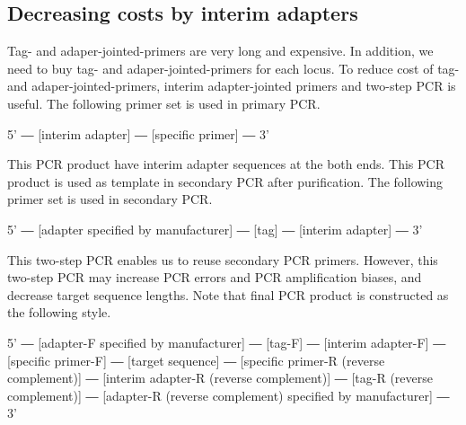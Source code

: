 \documentclass[titlepage,10pt,a4paper,english]{jsbook}
\newenvironment{pre}{\begin{leftbar}\raggedright\ttfamily\footnotesize\setlength{\baselineskip}{1.4em}}{\end{leftbar}\vspace{-1em}}
\begin{document}
\subsection{Decreasing costs by interim adapters}\label{subsection:interimadapter}

Tag- and adaper-jointed-primers are very long and expensive.
In addition, we need to buy tag- and adaper-jointed-primers for each locus.
To reduce cost of tag- and adaper-jointed-primers, interim adapter-jointed primers and two-step PCR is useful.
The following primer set is used in primary PCR.

\begin{pre}
5' ― [interim adapter] ― [specific primer] ― 3'
\end{pre}

This PCR product have interim adapter sequences at the both ends.
This PCR product is used as template in secondary PCR after purification.
The following primer set is used in secondary PCR.

\begin{pre}
5' ― [adapter specified by manufacturer] ― [tag] ― [interim adapter] ― 3'
\end{pre}

This two-step PCR enables us to reuse secondary PCR primers.
However, this two-step PCR may increase PCR errors and PCR amplification biases, and decrease target sequence lengths.
Note that final PCR product is constructed as the following style.

\begin{pre}
5' ― [adapter-F specified by manufacturer] ― [tag-F] ― [interim adapter-F] ― [specific primer-F] ― [target sequence] ― [specific primer-R (reverse complement)] ― [interim adapter-R (reverse complement)] ― [tag-R (reverse complement)] ― [adapter-R (reverse complement) specified by manufacturer] ― 3'
\end{pre}
\end{document}
